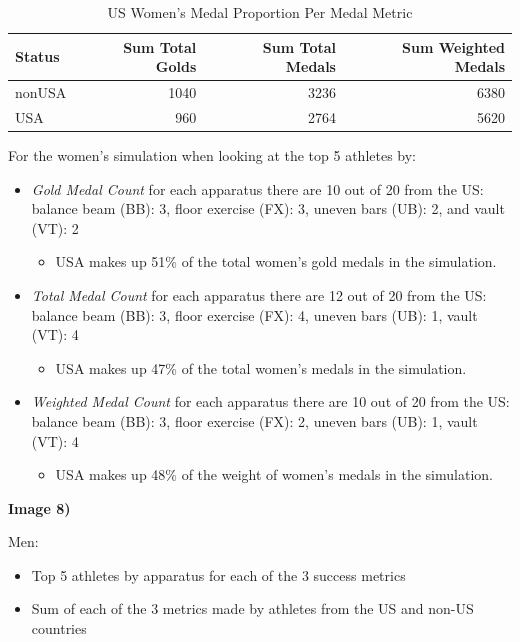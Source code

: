 \documentclass[
  10.5pt,
  letterpaper,
  DIV=11,
  numbers=noendperiod]{scrartcl}
\providecommand{\tightlist}{%
  \setlength{\itemsep}{0pt}\setlength{\parskip}{0pt}}\usepackage{longtable,booktabs,array}
\begin{document}
\begin{table}[H]

\caption{US Women's Medal Proportion Per Medal Metric}
\centering
\fontsize{8}{10}\selectfont
\begin{tabular}[t]{l|r|r|r}
\hline
Status & Sum Total Golds & Sum Total Medals & Sum Weighted Medals\\
\hline
nonUSA & 1040 & 3236 & 6380\\
\hline
USA & 960 & 2764 & 5620\\
\hline
\end{tabular}
\end{table}

For the women's simulation when looking at the top 5 athletes by:

\begin{itemize}
\item
  \emph{Gold Medal Count} for each apparatus there are 10 out of 20 from
  the US: balance beam (BB): 3, floor exercise (FX): 3, uneven bars
  (UB): 2, and vault (VT): 2

  \begin{itemize}
  \tightlist
  \item
    USA makes up 51\% of the total women's gold medals in the
    simulation.
  \end{itemize}
\item
  \emph{Total Medal Count} for each apparatus there are 12 out of 20
  from the US: balance beam (BB): 3, floor exercise (FX): 4, uneven bars
  (UB): 1, vault (VT): 4

  \begin{itemize}
  \tightlist
  \item
    USA makes up 47\% of the total women's medals in the simulation.
  \end{itemize}
\item
  \emph{Weighted Medal Count} for each apparatus there are 10 out of 20
  from the US: balance beam (BB): 3, floor exercise (FX): 2, uneven bars
  (UB): 1, vault (VT): 4

  \begin{itemize}
  \tightlist
  \item
    USA makes up 48\% of the weight of women's medals in the simulation.
  \end{itemize}
\end{itemize}

\textbf{Image 8)}

Men:

\begin{itemize}
\item
  Top 5 athletes by apparatus for each of the 3 success metrics
\item
  Sum of each of the 3 metrics made by athletes from the US and non-US
  countries
\end{itemize}
\end{document}
